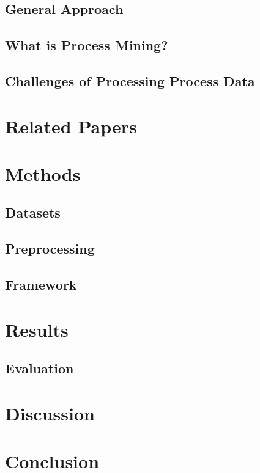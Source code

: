 \documentclass[12pt,a4paper,footinclude=true,headinclude=true]{report}
\begin{document}
\section{General Approach}

\section{What is Process Mining?}

\section{Challenges of Processing Process Data}

\chapter{Related Papers}


\chapter{Methods}
\label{sec:methods}

\section{Datasets}
\label{sec:datasets}

\section{Preprocessing}
\label{sec:preprocessing}

\section{Framework}

\chapter{Results}
\label{sec:results}

\section{Evaluation}
\label{subsec:evaluation}


\chapter{Discussion}
\label{sec:dicussion}


\chapter{Conclusion}
\label{sec:conclusion}

\printbibliography
\printglossary


\appendix
\end{document}
